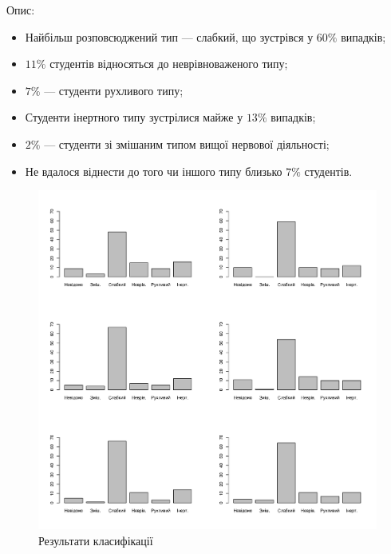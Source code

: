 Опис:
\begin{itemize}
  \item
    Найбільш розповсюджений тип --- слабкий, що зустрівся у $60\%$
    випадків;
  \item
    $11\%$ студентів відносяться до неврівноваженого типу;
  \item
    $7\%$ --- студенти рухливого типу;
  \item
    Студенти інертного типу зустрілися майже у $13\%$ випадків;
  \item
    $2\%$ --- студенти зі змішаним типом вищої нервової діяльності;
  \item
    Не вдалося віднести до того чи іншого типу близько $7\%$ студентів.
\end{itemize}

\begin{figure}[h]
  \centering
  \includegraphics[width=\textwidth]{images/poisson_types}
  \caption{Результати класифікації}
  \label{fig:tapping:poisson:types}
\end{figure}
